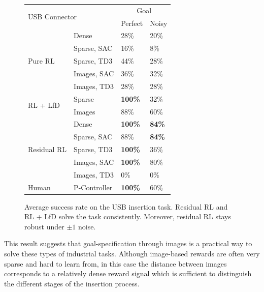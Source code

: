 \begin{figure}
    \label{tab:goal_pertubation_USB}
    \renewcommand{\arraystretch}{1.0}
    \begin{center}
    \small
    \begin{tabular}{|l|l|l|l|}
    \hline
    
    \multicolumn{2}{|l|}{\multirow{2}{*}{USB Connector}} & \multicolumn{2}{c|}{Goal}                                 \\ \cline{3-4} 
    \multicolumn{2}{|l|}{}                     & \multicolumn{1}{c|}{Perfect} & \multicolumn{1}{c|}{Noisy} \\ \hline \hline
    
    \multirow{5}{*}{Pure RL}   
     & Dense & 28\% & 20\% \\ 
     & Sparse, \;SAC & 16\% & 8\% \\ 
     & Sparse, \;TD3 & 44\% & 28\% \\ 
      & Images, SAC & 36\% & 32\% \\ 
       & Images, TD3 & 28\% & 28\% \\ \hline
    \multirow{2}{*}{RL + LfD} & Sparse &\textbf{100\%} & 32\% \\ 
     & Images & 88\% & 60\% \\ \hline
    \multirow{5}{*}{Residual RL} & Dense &\textbf{100\%} & \textbf{84\%} \\ 
     & Sparse,\: SAC & 88\% &  \textbf{84\%}\\ 
     & Sparse,\: TD3 &\textbf{100\%} & 36\% \\
     & Images, SAC & \textbf{100\%} & 80\% \\
      & Images, TD3 &  0\%& 0\%\\
      \hline
    \multirow{1}{*}{Human} & P-Controller & \textbf{100\%} & 60\% \\   \hline
    \end{tabular}
    \end{center}
    \vspace{5pt}
    \caption{Average success rate on the USB insertion task. Residual RL and RL + LfD solve the task consistently. Moreover, residual RL stays robust under $\pm1$ noise. }
    \label{fig:TableUSB}
\end{figure}

This result suggests that goal-specification through images is a practical way to solve these types of industrial tasks. Although image-based rewards are often very sparse and hard to learn from, in this case the distance between images corresponds to a relatively dense reward signal which is sufficient to distinguish the different stages of the insertion process.


